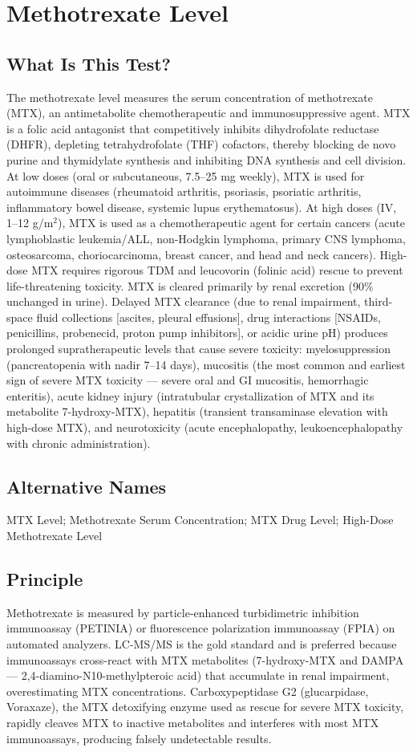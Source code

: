 \chapter{Methotrexate Level}
\section*{What Is This Test?}
The methotrexate level measures the serum concentration of methotrexate (MTX), an antimetabolite chemotherapeutic and immunosuppressive agent. MTX is a folic acid antagonist that competitively inhibits dihydrofolate reductase (DHFR), depleting tetrahydrofolate (THF) cofactors, thereby blocking de novo purine and thymidylate synthesis and inhibiting DNA synthesis and cell division. At low doses (oral or subcutaneous, 7.5--25 mg weekly), MTX is used for autoimmune diseases (rheumatoid arthritis, psoriasis, psoriatic arthritis, inflammatory bowel disease, systemic lupus erythematosus). At high doses (IV, 1--12 g/m$^2$), MTX is used as a chemotherapeutic agent for certain cancers (acute lymphoblastic leukemia/ALL, non-Hodgkin lymphoma, primary CNS lymphoma, osteosarcoma, choriocarcinoma, breast cancer, and head and neck cancers). High-dose MTX requires rigorous TDM and leucovorin (folinic acid) rescue to prevent life-threatening toxicity. MTX is cleared primarily by renal excretion (90\% unchanged in urine). Delayed MTX clearance (due to renal impairment, third-space fluid collections [ascites, pleural effusions], drug interactions [NSAIDs, penicillins, probenecid, proton pump inhibitors], or acidic urine pH) produces prolonged supratherapeutic levels that cause severe toxicity: myelosuppression (pancreatopenia with nadir 7--14 days), mucositis (the most common and earliest sign of severe MTX toxicity --- severe oral and GI mucositis, hemorrhagic enteritis), acute kidney injury (intratubular crystallization of MTX and its metabolite 7-hydroxy-MTX), hepatitis (transient transaminase elevation with high-dose MTX), and neurotoxicity (acute encephalopathy, leukoencephalopathy with chronic administration).
\section*{Alternative Names}
MTX Level; Methotrexate Serum Concentration; MTX Drug Level; High-Dose Methotrexate Level
\section*{Principle}
Methotrexate is measured by particle-enhanced turbidimetric inhibition immunoassay (PETINIA) or fluorescence polarization immunoassay (FPIA) on automated analyzers. LC-MS/MS is the gold standard and is preferred because immunoassays cross-react with MTX metabolites (7-hydroxy-MTX and DAMPA --- 2,4-diamino-N10-methylpteroic acid) that accumulate in renal impairment, overestimating MTX concentrations. Carboxypeptidase G2 (glucarpidase, Voraxaze), the MTX detoxifying enzyme used as rescue for severe MTX toxicity, rapidly cleaves MTX to inactive metabolites and interferes with most MTX immunoassays, producing falsely undetectable results.
